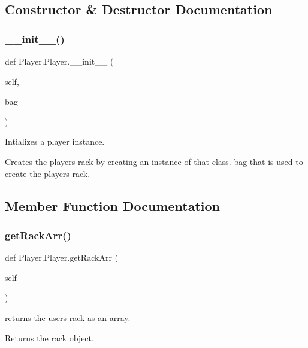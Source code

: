 \subsection{Constructor \& Destructor Documentation}
\mbox{\label{class_player_1_1_player_af2d1c87984c3a2843c09ac18e8c17eb4}} 
\subsubsection{\texorpdfstring{\+\_\+\+\_\+init\+\_\+\+\_\+()}{\_\_init\_\_()}}
{\footnotesize\ttfamily def Player.\+Player.\+\_\+\+\_\+init\+\_\+\+\_\+ (\begin{DoxyParamCaption}\item[{}]{self,  }\item[{}]{bag }\end{DoxyParamCaption})}



Intializes a player instance. 

Creates the player\textquotesingle{}s rack by creating an instance of that class.  bag that is used to create the players rack. 

\subsection{Member Function Documentation}
\mbox{\label{class_player_1_1_player_a5214d4674e59763b8eb74a977c7c14ba}} 
\subsubsection{\texorpdfstring{get\+Rack\+Arr()}{getRackArr()}}
{\footnotesize\ttfamily def Player.\+Player.\+get\+Rack\+Arr (\begin{DoxyParamCaption}\item[{}]{self }\end{DoxyParamCaption})}



returns the users rack as an array. 

\begin{DoxyReturn}{Returns}
the rack object. 
\end{DoxyReturn}
\mbox{\label{class_player_1_1_player_a99923bc6d51c2192332fbfd13b12e307}} 
